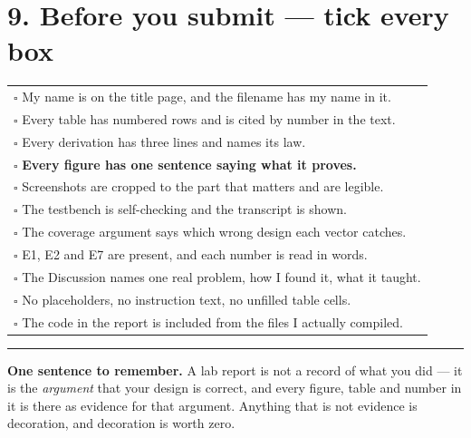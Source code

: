 \documentclass[11pt]{article}
\newcommand{\hr}{\vspace{2pt}\hrule\vspace{6pt}}
\begin{document}
\section*{9. Before you submit --- tick every box}

\begin{center}
\begin{tabular}{>{\raggedright\arraybackslash}p{15.4cm}}
\toprule
$\square$\; My name is on the title page, and the filename has my name in it. \\
$\square$\; Every table has numbered rows and is cited by number in the text. \\
$\square$\; Every derivation has three lines and names its law. \\
$\square$\; \textbf{Every figure has one sentence saying what it proves.} \\
$\square$\; Screenshots are cropped to the part that matters and are legible. \\
$\square$\; The testbench is self-checking and the transcript is shown. \\
$\square$\; The coverage argument says which wrong design each vector catches. \\
$\square$\; E1, E2 and E7 are present, and each number is read in words. \\
$\square$\; The Discussion names one real problem, how I found it, what it taught. \\
$\square$\; No placeholders, no instruction text, no unfilled table cells. \\
$\square$\; The code in the report is included from the files I actually compiled. \\
\bottomrule
\end{tabular}
\end{center}

\vspace{6pt}
\hr
{\small \textbf{One sentence to remember.} A lab report is not a record of what you
did --- it is the \emph{argument} that your design is correct, and every figure,
table and number in it is there as evidence for that argument. Anything that is not
evidence is decoration, and decoration is worth zero.}
\end{document}
